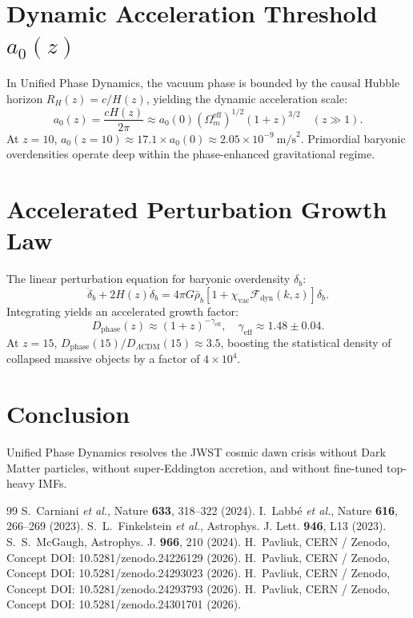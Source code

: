 \documentclass[11pt,a4paper]{article}
\begin{document}
\section{Dynamic Acceleration Threshold $a_0(z)$}
In Unified Phase Dynamics, the vacuum phase is bounded by the causal Hubble horizon $R_H(z) = c / H(z)$, yielding the dynamic acceleration scale:
\begin{equation}
a_0(z) = \frac{c H(z)}{2\pi} \approx a_0(0) (\Omega_m^{\mathrm{eff}})^{1/2} (1+z)^{3/2} \quad (z \gg 1).
\end{equation}
At $z = 10$, $a_0(z=10) \approx 17.1 \times a_0(0) \approx 2.05 \times 10^{-9}\ \mathrm{m/s}^2$. Primordial baryonic overdensities operate deep within the phase-enhanced gravitational regime.

\section{Accelerated Perturbation Growth Law}
The linear perturbation equation for baryonic overdensity $\delta_b$:
\begin{equation}
\ddot{\delta}_b + 2 H(z) \dot{\delta}_b = 4\pi G \bar{\rho}_b \left[ 1 + \chi_{\mathrm{vac}} \mathcal{F}_{\mathrm{dyn}}(k, z) \right] \delta_b.
\end{equation}
Integrating yields an accelerated growth factor:
\begin{equation}
D_{\mathrm{phase}}(z) \approx (1+z)^{-\gamma_{\mathrm{eff}}}, \quad \gamma_{\mathrm{eff}} \approx 1.48 \pm 0.04.
\end{equation}
At $z = 15$, $D_{\mathrm{phase}}(15) / D_{\Lambda\mathrm{CDM}}(15) \approx 3.5$, boosting the statistical density of collapsed massive objects by a factor of $4 \times 10^4$.

\section{Conclusion}
Unified Phase Dynamics resolves the JWST cosmic dawn crisis without Dark Matter particles, without super-Eddington accretion, and without fine-tuned top-heavy IMFs.

\begin{thebibliography}{99}
 S.~Carniani \textit{et al.}, Nature \textbf{633}, 318--322 (2024).
 I.~Labb{\'e} \textit{et al.}, Nature \textbf{616}, 266--269 (2023).
 S.~L.~Finkelstein \textit{et al.}, Astrophys. J. Lett. \textbf{946}, L13 (2023).
 S.~S.~McGaugh, Astrophys. J. \textbf{966}, 210 (2024).
 H.~Pavliuk, CERN / Zenodo, Concept DOI: 10.5281/zenodo.24226129 (2026).
 H.~Pavliuk, CERN / Zenodo, Concept DOI: 10.5281/zenodo.24293023 (2026).
 H.~Pavliuk, CERN / Zenodo, Concept DOI: 10.5281/zenodo.24293793 (2026).
 H.~Pavliuk, CERN / Zenodo, Concept DOI: 10.5281/zenodo.24301701 (2026).
\end{thebibliography}
\end{document}
